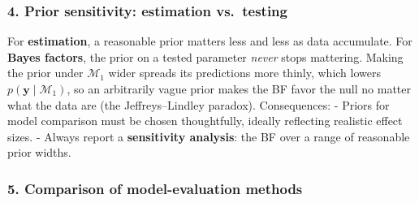\subsubsection{4. Prior sensitivity: estimation vs.~testing}

For \textbf{estimation}, a reasonable prior matters less and less as
data accumulate. For \textbf{Bayes factors}, the prior on a tested
parameter \emph{never} stops mattering. Making the prior under
\(\mathcal{M}_1\) wider spreads its predictions more thinly, which
lowers \(p(\mathbf{y}\mid\mathcal{M}_1)\), so an arbitrarily vague prior
makes the BF favor the null no matter what the data are (the
Jeffreys--Lindley paradox). Consequences: - Priors for model comparison
must be chosen thoughtfully, ideally reflecting realistic effect sizes.
- Always report a \textbf{sensitivity analysis}: the BF over a range of
reasonable prior widths.

\subsubsection{5. Comparison of model-evaluation methods}

